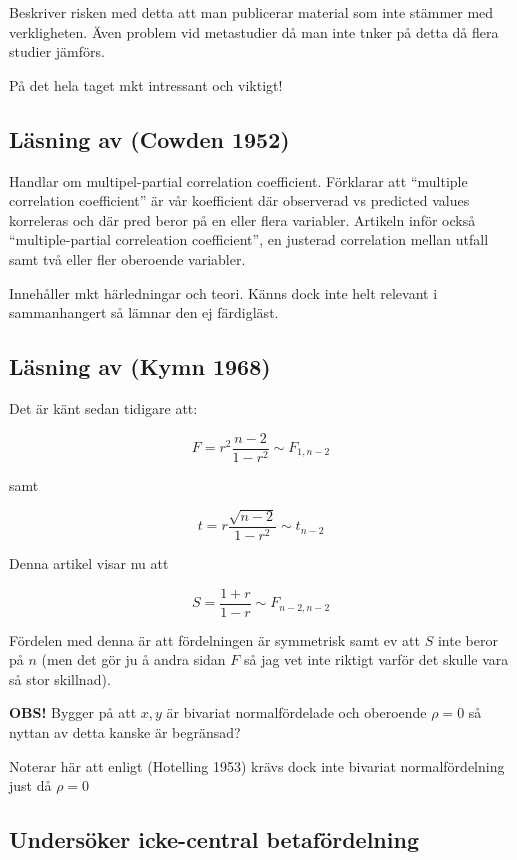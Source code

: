 \documentclass[]{article}
\begin{document}
Beskriver risken med detta att man publicerar material som inte stämmer
med verkligheten. Även problem vid metastudier då man inte tnker på
detta då flera studier jämförs.

På det hela taget mkt intressant och viktigt!

\subsection{Läsning av (Cowden 1952)}\label{lasning-av-cowden1952}

Handlar om multipel-partial correlation coefficient. Förklarar att
``multiple correlation coefficient'' är vår koefficient där observerad
vs predicted values korreleras och där pred beror på en eller flera
variabler. Artikeln inför också ``multiple-partial correleation
coefficient'', en justerad correlation mellan utfall samt två eller fler
oberoende variabler.

Innehåller mkt härledningar och teori. Känns dock inte helt relevant i
sammanhangert så lämnar den ej färdigläst.

\subsection{Läsning av (Kymn 1968)}\label{lasning-av-kymn1968}

Det är känt sedan tidigare att:

\[ F = r^2\frac{n-2}{1-r^2} \sim F_{1, n-2} \]

samt

\[ t = r\frac{\sqrt{n-2}}{1-r^2} \sim t_{n-2} \]

Denna artikel visar nu att

\[ S = \frac{1+r}{1-r} \sim F_{n-2, n-2} \]

Fördelen med denna är att fördelningen är symmetrisk samt ev att \(S\)
inte beror på \(n\) (men det gör ju å andra sidan \(F\) så jag vet inte
riktigt varför det skulle vara så stor skillnad).

\textbf{OBS!} Bygger på att \(x, y\) är bivariat normalfördelade och
oberoende \(\rho = 0\) så nyttan av detta kanske är begränsad?

Noterar här att enligt (Hotelling 1953) krävs dock inte bivariat
normalfördelning just då \(\rho = 0\)

\subsection{Undersöker icke-central
betafördelning}\label{undersoker-icke-central-betafordelning}
\end{document}
